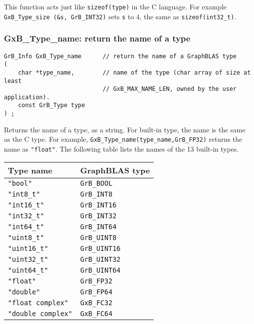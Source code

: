 \documentclass[12pt]{article}
\begin{document}
This function acts just like \verb'sizeof(type)' in the C language.  For
example \verb'GxB_Type_size (&s, GrB_INT32)' sets \verb's' to 4, the same as
\verb'sizeof(int32_t)'.

\subsubsection{{\sf GxB\_Type\_name:} return the name of a type}
\label{type_name}

\begin{mdframed}[userdefinedwidth=6in]
{\footnotesize
\begin{verbatim}
GrB_Info GxB_Type_name      // return the name of a GraphBLAS type
(
    char *type_name,        // name of the type (char array of size at least
                            // GxB_MAX_NAME_LEN, owned by the user application).
    const GrB_Type type
) ;
\end{verbatim}
}\end{mdframed}

Returns the name of a type, as a string.  For built-in type, the name is
the same as the C type.  For example, \verb'GxB_Type_name(type_name,GrB_FP32)'
returns the name as \verb'"float"'.  The following table lists the
names of the 13 built-in types.

\vspace{0.2in}
{\small
\begin{tabular}{ll}
Type name & GraphBLAS type \\
\hline
    \verb'"bool"'           & \verb'GrB_BOOL' \\
    \verb'"int8_t"'         & \verb'GrB_INT8' \\
    \verb'"int16_t"'        & \verb'GrB_INT16' \\
    \verb'"int32_t"'        & \verb'GrB_INT32' \\
    \verb'"int64_t"'        & \verb'GrB_INT64' \\
    \verb'"uint8_t"'        & \verb'GrB_UINT8' \\
    \verb'"uint16_t"'       & \verb'GrB_UINT16' \\
    \verb'"uint32_t"'       & \verb'GrB_UINT32' \\
    \verb'"uint64_t"'       & \verb'GrB_UINT64' \\
    \verb'"float"'          & \verb'GrB_FP32' \\
    \verb'"double"'         & \verb'GrB_FP64' \\
    \verb'"float complex"'  & \verb'GxB_FC32' \\
    \verb'"double complex"' & \verb'GxB_FC64' \\
\end{tabular}}
\end{document}
